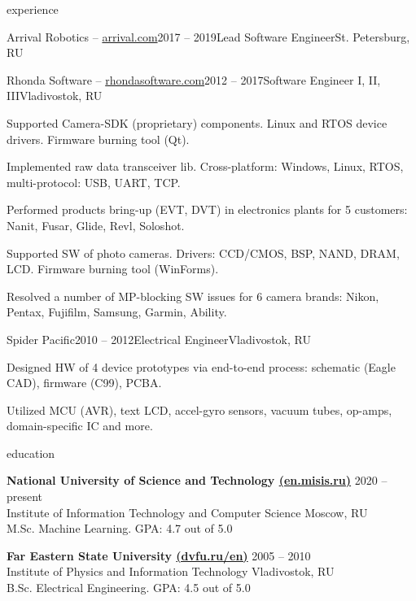 \documentclass{template}
\begin{document}
\begin{rSection}{experience}
\begin{rCompany}{Arrival Robotics -- \href{https://arrival.com}{arrival.com}}{2017 -- 2019}{Lead Software Engineer}{St. Petersburg, RU}
\end{rCompany}
\begin{rCompany}{Rhonda Software -- \href{https://rhondasoftware.com}{rhondasoftware.com}}{2012 -- 2017}{Software Engineer I, II, III}{Vladivostok, RU}

\item Supported Camera-SDK (proprietary) components. Linux and RTOS device drivers. Firmware burning tool (Qt).
\item Implemented raw data transceiver lib. Cross-platform: Windows, Linux, RTOS, multi-protocol: USB, UART, TCP.
\item Performed products bring-up (EVT, DVT) in electronics plants for 5 customers: Nanit, Fusar, Glide, Revl, Soloshot.
\item Supported SW of photo cameras. Drivers: CCD/CMOS, BSP, NAND, DRAM, LCD. Firmware burning tool (WinForms).
\item Resolved a number of MP-blocking SW issues for 6 camera brands: Nikon, Pentax, Fujifilm, Samsung, Garmin, Ability.

\end{rCompany}
\begin{rCompany}{Spider Pacific}{2010 -- 2012}{Electrical Engineer}{Vladivostok, RU}

\item Designed HW of 4 device prototypes via end-to-end process: schematic (Eagle CAD), firmware (C99), PCBA.
\item Utilized MCU (AVR), text LCD, accel-gyro sensors, vacuum tubes, op-amps, domain-specific IC and more.

\end{rCompany}
\end{rSection}

\begin{rSection}{education}

{\bf National University of Science and Technology  \href{https://en.misis.ru}{(en.misis.ru)}} \hfill {2020 -- present} \\
Institute of Information Technology and Computer Science \hfill {Moscow, RU} \\
M.Sc. Machine Learning. GPA: 4.7 out of 5.0

{\bf Far Eastern State University \href{https://dvfu.ru/en}{(dvfu.ru/en)}} \hfill {2005 -- 2010} \\
Institute of Physics and Information Technology \hfill {Vladivostok, RU} \\
B.Sc. Electrical Engineering. GPA: 4.5 out of 5.0

\end{rSection}
\end{document}
